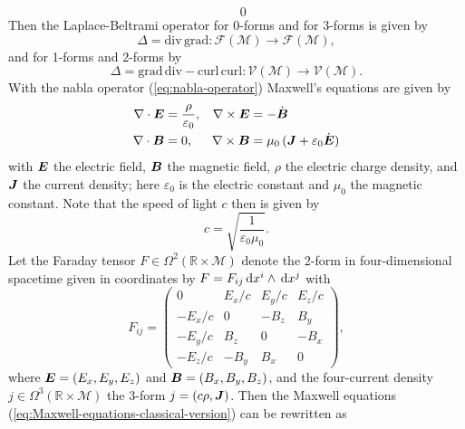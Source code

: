 \begin{beispiel}
\begin{equation}
\begin{array}{c}
		\end{array}
		\
		0
	\end{equation}
	Then the Laplace-Beltrami operator for 0-forms and for 3-forms is given by
	$$
	\Delta = \mathrm{div} \, \mathrm{grad} : \mathscr{F}(\mathscr{M}) \to \mathscr{F}(\mathscr{M}),
	$$
	and for 1-forms and 2-forms by
	$$
	\Delta = \mathrm{grad} \, \mathrm{div} - \mathrm{curl} \, \mathrm{curl}: \mathscr{V}(\mathscr{M}) \to \mathscr{V}(\mathscr{M}).
	$$
	With the nabla operator (\ref{eq:nabla-operator})
	Maxwell's equations
	are given by
	\begin{align}
		\nabla \cdot \mbox{$\boldsymbol{E}$} & = \frac{\rho}{\varepsilon_0},
		&
		\nabla \times \mbox{$\boldsymbol{E}$} & = - \dot{\mbox{$\boldsymbol{B}$}}
		\nonumber \\
		\nabla \cdot \mbox{$\boldsymbol{B}$} & = 0,
		&
		\nabla \times \mbox{$\boldsymbol{B}$} & = \mu_0 \, (\mbox{$\boldsymbol{J}$} + \varepsilon_0 \dot{\mbox{$\boldsymbol{E}$}})
		\label{eq:Maxwell-equations-classical-version}
	\end{align}
	with $\mbox{$\boldsymbol{E}$}$ the electric field, $\mbox{$\boldsymbol{B}$}$ the magnetic field, $\rho$ the electric charge density, and $\mbox{$\boldsymbol{J}$}$ the current density; here $\varepsilon_{0}$ is the 
	electric constant %
	and $\mu_{0}$ 
	the magnetic constant. %
	Note that the speed of light $c$ then is given by
	\begin{equation}
		c = \sqrt{\frac{1}{\varepsilon_0 \mu_0}}
		.
		\label{eq:speed-of-light}
	\end{equation}
	Let the Faraday tensor
	$F \in \Omega^2(\mathbb{R} \times \mathscr{M})$ denote the 2-form 
	in four-dimensional spacetime given in coordinates by $F = F_{ij} \,\mathrm{d} x^i \wedge \,\mathrm{d} x^j$ with
	\begin{equation}
		F_{ij}
		= \left(\begin{array}{cccc}
			0      & E_x/c & E_y/c & E_z/c \\
			-E_x/c &   0   & -B_z  &  B_y  \\
			-E_y/c &  B_z  &   0   & -B_x  \\
			-E_z/c & -B_y  &  B_x  &  0
		\end{array}\right)
		,
		\label{eq:Maxwell-equations}
	\end{equation}
	where $\mbox{$\boldsymbol{E}$} = (E_x, E_y, E_z)$ and $\mbox{$\boldsymbol{B}$} = (B_x, B_y, B_z)$,
	and the four-current density $j \in \Omega^3(\mathbb{R} \times \mathscr{M})$ the 3-form
	$j = (c\rho,\mbox{$\boldsymbol{J}$})$. \cites[265]{Jaenich-1992}[73]{Landau-Lifschitz-1997}
	Then the Maxwell equations (\ref{eq:Maxwell-equations-classical-version}) can be rewritten as 

\end{beispiel}
